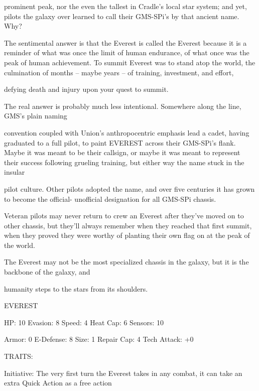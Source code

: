 prominent peak, nor the even the tallest in Cradle’s local star system; and yet, pilots the galaxy over learned  
to call their GMS-SPi’s by that ancient name. Why?    

The sentimental answer is that the Everest is called the Everest because it is a reminder of what was once  
the limit of human endurance, of what once was the peak of human achievement. To summit Everest was  
to stand atop the world, the culmination of months -- maybe years -- of training, investment, and effort,  

defying death and injury upon your quest to summit.   

The real answer is probably much less intentional. Somewhere along the line, GMS’s plain naming  

convention coupled with Union’s anthropocentric emphasis lead a cadet, having graduated to a full pilot, to  
paint EVEREST across their GMS-SPi’s flank. Maybe it was meant to be their callsign, or maybe it was  
meant to represent their success following grueling training, but either way the name stuck in the insular  

pilot culture. Other pilots adopted the name, and over five centuries it has grown to become the official- 
unofficial designation for all GMS-SPi chassis.   

Veteran pilots may never return to crew an Everest after they’ve moved on to other chassis, but they’ll  
always remember when they reached that first summit, when they proved they were worthy of planting their  
own flag on at the peak of the world.   

The Everest may not be the most specialized chassis in the galaxy, but it is the backbone of the galaxy, and  

humanity steps to the stars from its shoulders. 
 

                                                      EVEREST 

  HP: 10          Evasion: 8                                Speed: 4             Heat Cap: 6          Sensors: 10 

 Armor: 0         E-Defense: 8                              Size: 1              Repair Cap: 4        Tech Attack:  
                                                                                                      +0 

                                                        TRAITS: 

  Initiative: The very first turn the Everest takes in any combat, it can take an extra Quick Action as a free  
 action 

